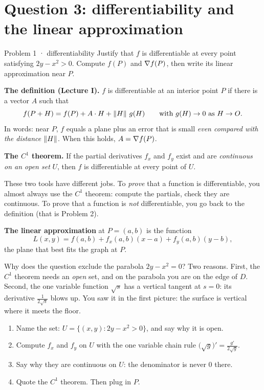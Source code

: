 \section{Question 3: differentiability and the linear approximation}

\begin{question}{Problem 1 \;·\; differentiability}
Justify that $f$ is differentiable at every point satisfying $2y-x^2>0$. Compute $f(P)$ and
$\nabla f(P)$, then write its linear approximation near $P$.
\end{question}

\begin{lesson}
\textbf{The definition (Lecture I).} $f$ is differentiable at an interior point $P$ if there is a
vector $A$ such that
\[
  f(P+H)=f(P)+A\cdot H+\left\lVert H\right\rVert\,g(H)\qquad\text{with } g(H)\to0 \text{ as } H\to O .
\]
In words: near $P$, $f$ equals a plane plus an error that is small \emph{even compared with the
distance} $\left\lVert H\right\rVert$. When this holds, $A=\nabla f(P)$.

\textbf{The $C^1$ theorem.} If the partial derivatives $f_x$ and $f_y$ exist and are
\emph{continuous on an open set} $U$, then $f$ is differentiable at every point of $U$.

\smallskip
These two tools have different jobs. To \emph{prove} that a function is differentiable, you almost
always use the $C^1$ theorem: compute the partials, check they are continuous. To prove that a
function is \emph{not} differentiable, you go back to the definition (that is Problem 2).

\textbf{The linear approximation} at $P=(a,b)$ is the function
\[
  L(x,y)=f(a,b)+f_x(a,b)(x-a)+f_y(a,b)(y-b),
\]
the plane that best fits the graph at $P$.
\end{lesson}

\begin{intuition}
Why does the question exclude the parabola $2y-x^2=0$? Two reasons. First, the $C^1$ theorem
needs an \emph{open} set, and on the parabola you are on the edge of $D$. Second, the one variable
function $\sqrt s$ has a vertical tangent at $s=0$: its derivative $\frac1{2\sqrt s}$ blows up. You
saw it in the first picture: the surface is vertical where it meets the floor.
\end{intuition}

\begin{howto}
\begin{enumerate}
  \item Name the set: $U=\{(x,y):2y-x^2>0\}$, and say why it is open.
  \item Compute $f_x$ and $f_y$ on $U$ with the one variable chain rule $\big(\sqrt{g}\big)'=\frac{g'}{2\sqrt g}$.
  \item Say why they are continuous on $U$: the denominator is never $0$ there.
  \item Quote the $C^1$ theorem. Then plug in $P$.
\end{enumerate}
\end{howto}

